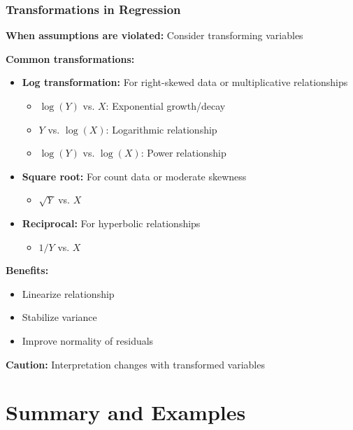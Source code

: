 \documentclass{beamer}
\begin{document}
\begin{frame}
\frametitle{Transformations in Regression}
\textbf{When assumptions are violated:} Consider transforming variables

\vspace{0.3cm}
\textbf{Common transformations:}
\begin{itemize}
\item \textbf{Log transformation:} For right-skewed data or multiplicative relationships
  \begin{itemize}
  \item $\log(Y)$ vs. $X$: Exponential growth/decay
  \item $Y$ vs. $\log(X)$: Logarithmic relationship
  \item $\log(Y)$ vs. $\log(X)$: Power relationship
  \end{itemize}

\item \textbf{Square root:} For count data or moderate skewness
  \begin{itemize}
  \item $\sqrt{Y}$ vs. $X$
  \end{itemize}

\item \textbf{Reciprocal:} For hyperbolic relationships
  \begin{itemize}
  \item $1/Y$ vs. $X$
  \end{itemize}
\end{itemize}

\vspace{0.3cm}
\textbf{Benefits:}
\begin{itemize}
\item Linearize relationship
\item Stabilize variance
\item Improve normality of residuals
\end{itemize}

\vspace{0.3cm}
\textbf{Caution:} Interpretation changes with transformed variables
\end{frame}

\section{Summary and Examples}
\end{document}
